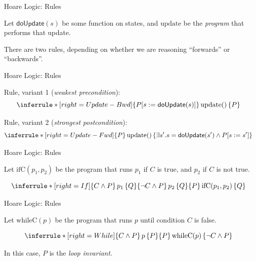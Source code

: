 \documentclass[xetex,aspectratio=169,14pt,hyperref={pdfpagelabels=true,pdflang={en-GB}}]{beamer}
\begin{document}
\begin{frame}
  {Hoare Logic: Rules}

  Let $\mathsf{doUpdate}(s)$ be some function on states, and
  $\mathrm{update}$ be the \emph{program} that performs that update.

  \bigskip

  There are two rules, depending on whether we are reasoning
  ``forwards'' or ``backwards''.
\end{frame}

\begin{frame}
  {Hoare Logic: Rules}

  Rule, variant 1 (\emph{weakest precondition}):
  \begin{displaymath}
    \inferrule* [right=Update-Bwd]
    { }
    {\{ P[s := \mathsf{doUpdate}(s)] \}\,\mathrm{update}()\,\{ P \}}
  \end{displaymath}

  \bigskip

  Rule, variant 2 (\emph{strongest postcondition}):
  \begin{displaymath}
    \inferrule* [right=Update-Fwd]
    { }
    {\{ P \}\,\mathrm{update}()\,\{ \exists s'. s = \mathsf{doUpdate}(s') \land P[s := s'] \}}
  \end{displaymath}
\end{frame}

\begin{frame}
  {Hoare Logic: Rules}

  Let $\mathrm{ifC}(p_1,p_2)$ be the program that runs $p_1$ if $C$ is true, and $p_2$ if $C$ is not true.

  \bigskip

  \begin{displaymath}
    \inferrule* [right=If]
    {\{ C \land P \}\,p_1\,\{ Q \} \\ \{ \lnot C \land P \}\,p_2\,\{ Q \}}
    {\{ P \}\,\mathrm{ifC}(p_1,p_2)\,\{ Q \}}
  \end{displaymath}
\end{frame}

\begin{frame}
  {Hoare Logic: Rules}

  Let $\mathrm{whileC}(p)$ be the program that runs $p$ until condition $C$ is false.

  \bigskip

  \begin{displaymath}
    \inferrule* [right=While]
    {\{ C \land P \}\,p\,\{ P \}}
    {\{ P \}\,\mathrm{whileC}(p)\,\{ \lnot C \land P \}}
  \end{displaymath}

  \bigskip

  In this case, $P$ is the \emph{loop invariant}.
\end{frame}
\end{document}
